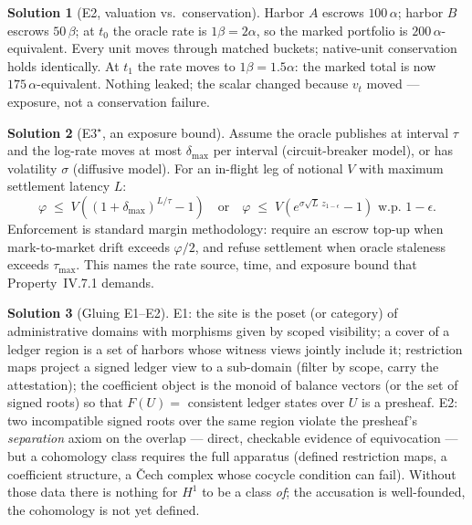 \documentclass[11pt,a4paper]{article}
\theoremstyle{definition}
\newtheorem{sol}{Solution}
\theoremstyle{remark}
\begin{document}
\begin{sol}[E2, valuation vs.\ conservation]
Harbor $A$ escrows $100\,\alpha$; harbor $B$ escrows $50\,\beta$; at $t_0$ the oracle rate is $1\beta = 2\alpha$, so the marked portfolio is $200\,\alpha$-equivalent. Every unit moves through matched buckets; native-unit conservation holds identically. At $t_1$ the rate moves to $1\beta = 1.5\alpha$: the marked total is now $175\,\alpha$-equivalent. Nothing leaked; the scalar changed because $v_t$ moved --- exposure, not a conservation failure.
\end{sol}

\begin{sol}[E3$^\star$, an exposure bound]
Assume the oracle publishes at interval $\tau$ and the log-rate moves at most $\delta_{\max}$ per interval (circuit-breaker model), or has volatility $\sigma$ (diffusive model). For an in-flight leg of notional $V$ with maximum settlement latency $L$:
\[ \varphi \;\le\; V\!\left((1+\delta_{\max})^{L/\tau} - 1\right) \quad\text{or}\quad \varphi \;\le\; V\!\left(e^{\sigma\sqrt{L}\,z_{1-\epsilon}} - 1\right) \text{ w.p. } 1-\epsilon. \]
Enforcement is standard margin methodology: require an escrow top-up when mark-to-market drift exceeds $\varphi/2$, and refuse settlement when oracle staleness exceeds $\tau_{\max}$. This names the rate source, time, and exposure bound that Property~IV.7.1 demands.
\end{sol}

\begin{sol}[Gluing E1--E2]
E1: the site is the poset (or category) of administrative domains with morphisms given by scoped visibility; a cover of a ledger region is a set of harbors whose witness views jointly include it; restriction maps project a signed ledger view to a sub-domain (filter by scope, carry the attestation); the coefficient object is the monoid of balance vectors (or the set of signed roots) so that $F(U) = $ consistent ledger states over $U$ is a presheaf. E2: two incompatible signed roots over the same region violate the presheaf's \emph{separation} axiom on the overlap --- direct, checkable evidence of equivocation --- but a cohomology class requires the full apparatus (defined restriction maps, a coefficient structure, a \v{C}ech complex whose cocycle condition can fail). Without those data there is nothing for $H^1$ to be a class \emph{of}; the accusation is well-founded, the cohomology is not yet defined.
\end{sol}
\end{document}
